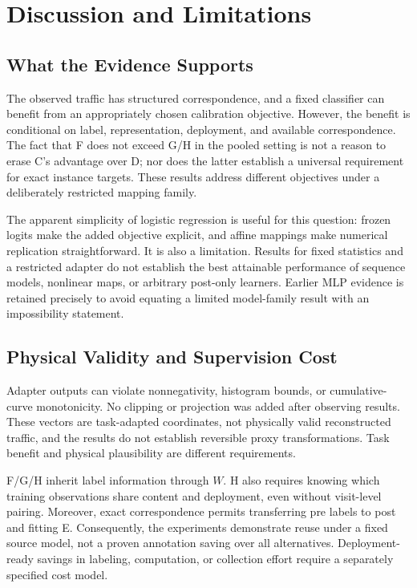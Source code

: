 \section{Discussion and Limitations}
\subsection{What the Evidence Supports}
The observed traffic has structured correspondence, and a fixed classifier can benefit from an appropriately chosen calibration objective. However, the benefit is conditional on label, representation, deployment, and available correspondence. The fact that F does not exceed G/H in the pooled setting is not a reason to erase C's advantage over D; nor does the latter establish a universal requirement for exact instance targets. These results address different objectives under a deliberately restricted mapping family.

The apparent simplicity of logistic regression is useful for this question: frozen logits make the added objective explicit, and affine mappings make numerical replication straightforward. It is also a limitation. Results for fixed statistics and a restricted adapter do not establish the best attainable performance of sequence models, nonlinear maps, or arbitrary post-only learners. Earlier MLP evidence is retained precisely to avoid equating a limited model-family result with an impossibility statement.

\subsection{Physical Validity and Supervision Cost}
Adapter outputs can violate nonnegativity, histogram bounds, or cumulative-curve monotonicity. No clipping or projection was added after observing results. These vectors are task-adapted coordinates, not physically valid reconstructed traffic, and the results do not establish reversible proxy transformations. Task benefit and physical plausibility are different requirements.

F/G/H inherit label information through $W$. H also requires knowing which training observations share content and deployment, even without visit-level pairing. Moreover, exact correspondence permits transferring pre labels to post and fitting E. Consequently, the experiments demonstrate reuse under a fixed source model, not a proven annotation saving over all alternatives. Deployment-ready savings in labeling, computation, or collection effort require a separately specified cost model.

